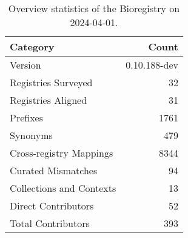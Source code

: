 \begin{table}
\caption{Overview statistics of the Bioregistry on 2024-04-01.}
\label{tab:bioregistry-summary}
\begin{tabular}{lr}
\toprule
Category & Count \\
\midrule
Version & 0.10.188-dev \\
Registries Surveyed & 32 \\
Registries Aligned & 31 \\
Prefixes & 1761 \\
Synonyms & 479 \\
Cross-registry Mappings & 8344 \\
Curated Mismatches & 94 \\
Collections and Contexts & 13 \\
Direct Contributors & 52 \\
Total Contributors & 393 \\
\bottomrule
\end{tabular}
\end{table}
